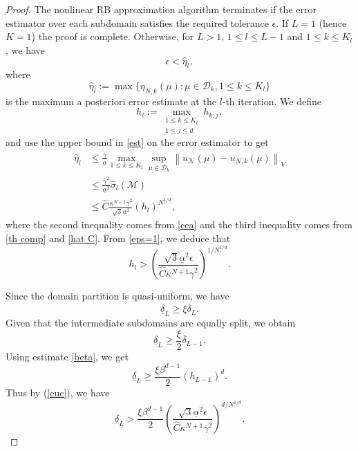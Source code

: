 \documentclass[12pt]{article}
\theoremstyle{remark}
\theoremstyle{definition}
\numberwithin{equation}{section}
\begin{document}
\begin{proof}
    The nonlinear RB approximation algorithm terminates if the error estimator over each subdomain satisfies the required tolerance $\epsilon$. If $L=1$ (hence $K=1$) the proof is complete. Otherwise, for $L>1$, $ 1\leq l \leq L-1$ and $1 \leq k \leq K_l$, we have
    \begin{equation}
        \epsilon < \hat\eta_l,
        \label{eps=1}
    \end{equation}
    where
    \begin{equation}
        \hat\eta_l:=\max\{\eta_{N,k}(\mu) : \mu \in \mathcal{D}_k, 1\leq k \leq K_l \}
    \end{equation}
    is the maximum a posteriori error estimate at the $l$-th iteration. We define 
    \begin{equation}
        h_l:=\max_{\substack{1 \leq k \leq K_l \\ 1 \leq j \leq d}}h_{k,j},
    \end{equation}
    and use the upper bound in \eqref{est} on the error estimator to get 
    \begin{align}
    \hat\eta_l &\leq \frac{\overline{\gamma}}{\underline{\alpha}} \max_{1 \leq k \leq K_l}\sup_{\mu \in \mathcal{D}_k} \left\|u_{\mathcal{N}}(\mu)-u_{N,k}(\mu)\right\|_V\\
    &\leq \frac{\overline{\gamma}^2}{\underline{\alpha}^2} \hat{\sigma}_l(\mathcal{M})\\
    &\leq \hat C \frac{\kappa ^{N+1}\overline{\gamma}^2}{{\sqrt{3}\underline{\alpha}^2}} (h_l)^{N^{1/d}} ,
    \label{eta_1}
    \end{align}
    where the second inequality comes from \eqref{cea} and the third inequality comes from \eqref{th comp} and \eqref{hat C}. From \eqref{eps=1}, we deduce that 
    \begin{equation}
        h_l > \left(\frac{\sqrt{3}\underline{\alpha}^2 \epsilon}{\hat C \kappa ^{N+1}\overline{\gamma}^2}\right)^{1/N^{1/d}}.
        \label{euc}
    \end{equation}

    Since the domain partition is quasi-uniform, we have
    \begin{equation}
        \underline{\delta}_L \geq \xi \overline{\delta}_L.
    \end{equation}
    Given that the intermediate subdomains are equally split, we obtain
    \begin{equation}
        \underline{\delta}_L \geq \frac{\xi}{2} \overline{\delta}_{L-1}.
    \end{equation}
    Using estimate \eqref{beta}, we get
    \begin{equation}
        \underline{\delta}_L \geq \frac{\xi \beta^{d-1}}{2} (h_{L-1})^d.
    \end{equation}
    Thus by (\ref{euc}), we have 
    \begin{equation}
        \underline{\delta}_L  > \frac{\xi \beta^{d-1} }{2} \left(\frac{\sqrt{3}\underline{\alpha}^2 \epsilon}{\hat C \kappa ^{N+1}\overline{\gamma}^2}\right)^{d/N^{1/d}}.
        \label{lower=1}
    \end{equation}
    

\end{proof}
\end{document}
